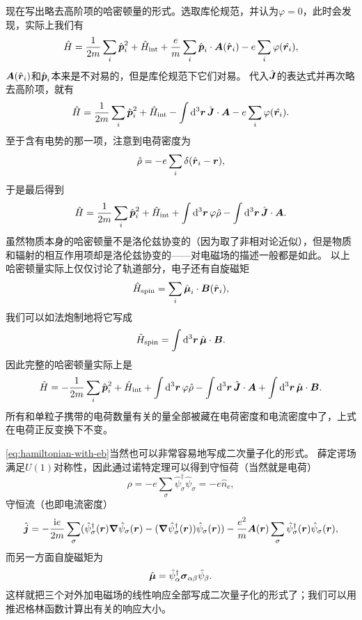 \documentclass[hyperref, UTF8, a4paper]{ctexart}
\newcommand*{\ii}{\mathrm{i}}
\begin{document}
现在写出略去高阶项的哈密顿量的形式。选取库伦规范，并认为$\varphi=0$，此时会发现，实际上我们有
\[
    \hat{H} = \frac{1}{2m} \sum_i \hat{\vb*{p}}_i^2 + \hat{H}_\text{int} + \frac{e}{m} \sum_i \hat{\vb*{p}}_i \cdot \vb*{A}(\hat{\vb*{r}}_i) - e \sum_i \varphi(\hat{\vb*{r}_i}),
\]
$\vb*{A}(\hat{\vb*{r}}_i)$和$\hat{\vb*{p}}_i$本来是不对易的，但是库伦规范下它们对易。
代入$\hat{\vb*{J}}$的表达式并再次略去高阶项，就有
\[
    \hat{H} = \frac{1}{2m} \sum_i \hat{\vb*{p}}_i^2 + \hat{H}_\text{int} - \int \dd[3]{\vb*{r}} \hat{\vb*{J}} \cdot \vb*{A} - e \sum_i \varphi(\hat{\vb*{r}_i}).
\]
至于含有电势的那一项，注意到电荷密度为
\[
    \hat{\rho} = - e \sum_{i} \delta(\hat{\vb*{r}}_i - \vb*{r}),
\]
于是最后得到
\begin{equation}
    \hat{H} = \frac{1}{2m} \sum_i \hat{\vb*{p}}_i^2 + \hat{H}_\text{int} + \int \dd[3]{\vb*{r}} \varphi \hat{\rho} - \int \dd[3]{\vb*{r}} \hat{\vb*{J}} \cdot \vb*{A}.
\end{equation}
虽然物质本身的哈密顿量不是洛伦兹协变的（因为取了非相对论近似），但是物质和辐射的相互作用项却是洛伦兹协变的——对电磁场的描述一般都是如此。
以上哈密顿量实际上仅仅讨论了轨道部分，电子还有自旋磁矩
\[
    \hat{H}_{\text{spin}} = \sum_i \hat{\vb*{\mu}}_i \cdot \vb*{B}(\hat{\vb*{r}}_i),
\]
我们可以如法炮制地将它写成
\[
    \hat{H}_{\text{spin}} = \int \dd[3]{\vb*{r}} \hat{\vb*{\mu}} \cdot \vb*{B}.
\]
因此完整的哈密顿量实际上是
\begin{equation}
    \hat{H} = - \frac{1}{2m} \sum_i \hat{\vb*{p}}_i^2 + \hat{H}_\text{int} + \int \dd[3]{\vb*{r}} \varphi \hat{\rho} - \int \dd[3]{\vb*{r}} \hat{\vb*{J}} \cdot \vb*{A} + \int \dd[3]{\vb*{r}} \hat{\vb*{\mu}} \cdot \vb*{B}.
    \label{eq:hamiltonian-with-eb}
\end{equation}
所有和单粒子携带的电荷数量有关的量全部被藏在电荷密度和电流密度中了，上式在电荷正反变换下不变。

\eqref{eq:hamiltonian-with-eb}当然也可以非常容易地写成二次量子化的形式。
薛定谔场满足$U(1)$对称性，因此通过诺特定理可以得到守恒荷（当然就是电荷）
\begin{equation}
    \rho = - e \sum_\sigma \hat{\psi}^\dagger_\sigma \hat{\psi}_\sigma = - e \hat{n}_\text{e},
\end{equation}
守恒流（也即电流密度）
\begin{equation}
    \hat{\vb*{j}} = - \frac{\ii e}{2m} \sum_\sigma (\hat{\psi}_\sigma^\dagger(\vb*{r}) \grad{\hat{\psi}_\sigma}(\vb*{r}) - (\grad{\hat{\psi}_\sigma^\dagger}(\vb*{r})) \hat{\psi}_\sigma(\vb*{r})) - \frac{e^2}{m} \vb*{A}(\vb*{r}) \sum_\sigma \hat{\psi}^\dagger_\sigma(\vb*{r}) \hat{\psi}_\sigma(\vb*{r}),
\end{equation}
而另一方面自旋磁矩为
\begin{equation}
    \hat{\vb*{\mu}} = \hat{\psi}^\dagger_\alpha \vb*{\sigma}_{\alpha \beta} \hat{\psi}_\beta.
\end{equation}
这样就把三个对外加电磁场的线性响应全部写成二次量子化的形式了；我们可以用推迟格林函数计算出有关的响应大小。
\end{document}
